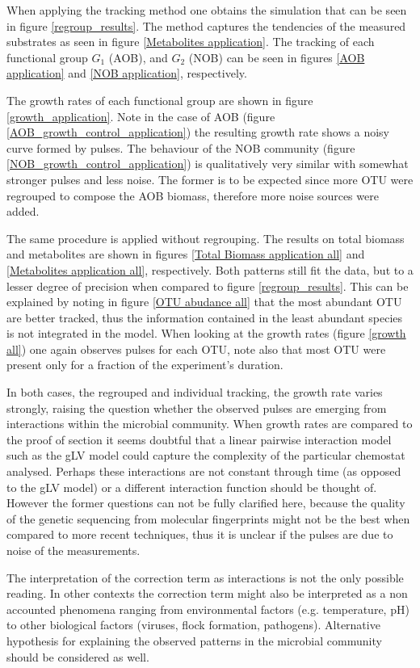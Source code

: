 \documentclass[3p,times]{article}
\begin{document}
When applying the tracking method one obtains the simulation that can be seen in figure \ref{regroup_results}. The method captures the tendencies of the measured substrates as seen in figure \ref{Metabolites application}. The tracking of each functional group $G_1$ (AOB), and $G_2$ (NOB) can be seen in figures \ref{AOB application} and \ref{NOB application}, respectively. 

The growth rates of each functional group are shown in figure \ref{growth_application}. Note in the case of AOB (figure \ref{AOB_growth_control_application}) the resulting growth rate shows a noisy curve formed by pulses. The behaviour of the NOB community (figure \ref{NOB_growth_control_application}) is qualitatively very similar with somewhat stronger pulses and less noise. The former is to be expected since more OTU were regrouped to compose the AOB biomass, therefore more noise sources were added. 

The same procedure is applied without regrouping. The results on total biomass and metabolites are shown in figures \ref{Total Biomass application all} and \ref{Metabolites application all}, respectively. Both patterns still fit the data, but to a lesser degree of precision when compared to figure \ref{regroup_results}. This can be explained by noting in figure \ref{OTU abudance all} that the most abundant OTU are better tracked, thus the information contained in the least abundant species is not integrated in the model. When looking at the growth rates (figure \ref{growth all}) one again observes pulses for each OTU, note also that most OTU were present only for a fraction of the experiment's duration. 

In both cases, the regrouped and individual tracking, the growth rate varies strongly, raising the question whether the observed pulses are emerging from interactions within the microbial community. When growth rates are compared to the proof of section it seems doubtful that a linear pairwise interaction model such as the gLV model could capture the complexity of the particular chemostat analysed. Perhaps these interactions are not constant through time (as opposed to the gLV model) or a different interaction function should be thought of. However the former questions can not be fully clarified here, because the quality of the genetic sequencing from molecular fingerprints might not be the best when compared to more recent techniques, thus it is unclear if the pulses are due to noise of the measurements.

The interpretation of the correction term as interactions is not the only possible reading. In other contexts the correction term might also be interpreted as a non accounted phenomena ranging from environmental factors (e.g. temperature, pH) to other biological factors (viruses, flock formation, pathogens). Alternative hypothesis for explaining the observed patterns in the microbial community should be considered as well. 
\end{document}
